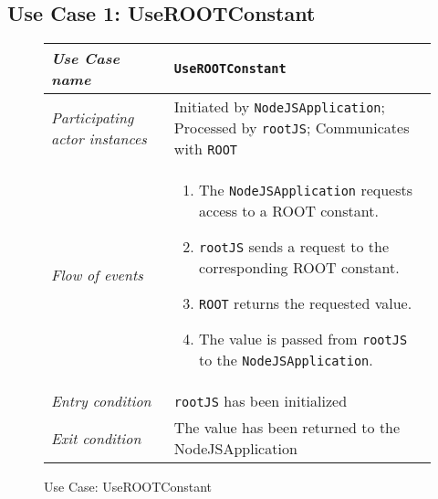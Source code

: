 \subsection{Use Case 1: UseROOTConstant}

\begin{figure}[htb]
	\centering
	\begin{longtable}{p{3cm} @{\hskip 1cm} p{12cm}}
		\hline
		
		\textit{Use Case name} & \texttt{UseROOTConstant}\\
		\hline
		
		\textit{Participating actor instances} & Initiated by \texttt{NodeJSApplication}; Processed by \texttt{rootJS}; Communicates with \texttt{ROOT}\\
		\hline
		
		\textit{Flow of events} &
			\begin{enumerate}
				\item The \texttt{NodeJSApplication} requests access to a ROOT constant.
				\item \texttt{rootJS} sends a request to the corresponding ROOT constant.
				\item \texttt{ROOT} returns the requested value.
	                        \item The value is passed from \texttt{rootJS} to the \texttt{NodeJSApplication}.
			\end{enumerate}
			\\
		\hline
		
		\textit{Entry condition} & \texttt{rootJS} has been initialized\\
		\hline
		
		\textit{Exit condition} & The value has been returned to the NodeJSApplication\\
        \hline
	\end{longtable}
	
	\caption{Use Case: UseROOTConstant}
\end{figure}
